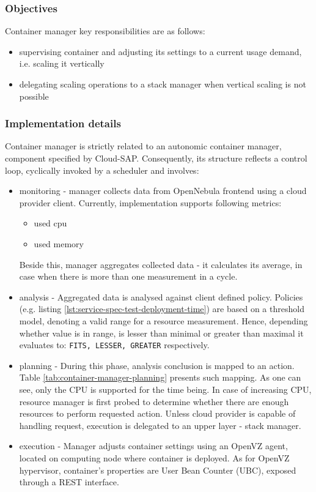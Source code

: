 \subsubsection{Objectives}
Container manager key responsibilities are as follows:
\begin{itemize}
 \item supervising container and adjusting its settings to a current usage demand, i.e. scaling it vertically
 \item delegating scaling operations to a stack manager when vertical scaling is not possible
\end{itemize}

\subsubsection{Implementation details}
Container manager is strictly related to an autonomic container manager, component specified by Cloud-SAP. Consequently, its structure reflects a control loop, cyclically invoked by a scheduler and involves:
\begin{itemize}
 \item monitoring - manager collects data from OpenNebula frontend using a cloud provider client. Currently, implementation supports following metrics:
    \begin{itemize}
     \item used cpu
     \item used memory
    \end{itemize}
    Beside this, manager aggregates collected data - it calculates its average, in case when there is more than one measurement in a cycle.
    
 \item analysis - Aggregated data is analysed against client defined policy. Policies (e.g. listing \ref{lst:service-spec-test-deployment-time}) are based on a threshold model, denoting a valid range for a resource measurement. Hence, depending whether value is in range, is lesser than minimal or greater than maximal it evaluates to: \texttt{FITS, LESSER, GREATER} respectively.
 
 \item planning - During this phase, analysis conclusion is mapped to an action. Table \ref{tab:container-manager-planning} presents such mapping. As one can see, only the CPU is supported for the time being. In case of increasing CPU, resource manager is first probed to determine whether there are enough resources to perform requested action. Unless cloud provider is capable of handling request, execution is delegated to an upper layer - stack manager.
 
 \item execution - Manager adjusts container settings using an OpenVZ agent, located on computing node where container is deployed. As for OpenVZ hypervisor, container's properties are User Bean Counter (UBC), exposed through a REST interface.
\end{itemize}

